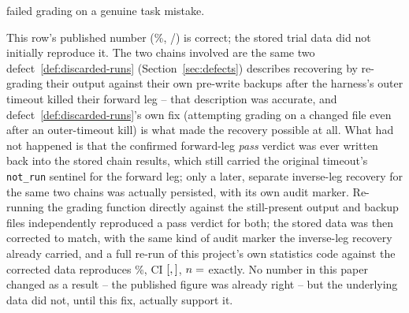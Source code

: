 \documentclass[11pt]{article}
\DeclareRobustCommand{\claim}[2]{#2}
\begin{document}
\begin{description}
  failed grading on a genuine task mistake.
\item[Note d (Table~\ref{tab:render-gate}, Table structural)] This row's published number
  (\%, /) is correct; the stored trial data did not initially reproduce it. \claim{defect-3-table-recovery}{The two chains involved
  are the same two defect~\ref{def:discarded-runs} (Section~\ref{sec:defects}) describes recovering by re-grading their
  output against their own pre-write backups after the harness's outer timeout killed their
  forward leg} -- that description was accurate, and \claim{defect-3-table-recovery}{defect~\ref{def:discarded-runs}'s own fix (attempting grading on a
  changed file even after an outer-timeout kill) is what made the recovery possible at all.} What
  had not happened is that the confirmed forward-leg \emph{pass} verdict was ever written back
  into the stored chain results, which still carried the original timeout's \texttt{not\_run}
  sentinel for the forward leg; only a later, separate inverse-leg recovery for the same two
  chains was actually persisted, with its own audit marker. Re-running the grading function
  directly against the still-present output and backup files independently reproduced a pass
  verdict for both; the stored data was then corrected to match, with the same kind of audit
  marker the inverse-leg recovery already carried, and a full re-run of this project's own
  statistics code against the corrected data reproduces \%, CI $[\val{rg.table.treatment.ci_lo}, \val{rg.table.treatment.ci_hi}]$, $n=\val{rg.table.treatment.n}$ exactly.
  No number in this paper changed as a result -- the published figure was already right -- but
  the underlying data did not, until this fix, actually support it.
\end{description}
\end{document}
